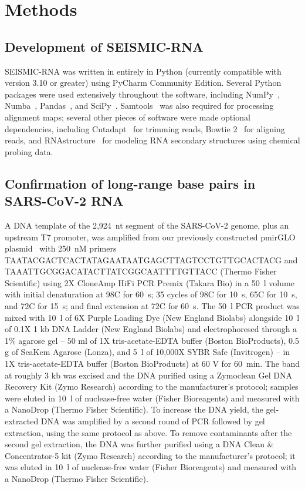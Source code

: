 \documentclass[main.tex]{subfiles}
\begin{document}
\section{Methods}
\label{methods}


\subsection{Development of SEISMIC-RNA}

SEISMIC-RNA was written in entirely in Python (currently compatible with version 3.10 or greater) using PyCharm Community Edition.
Several Python packages were used extensively throughout the software, including NumPy~\cite{Harris2020}, Numba~\cite{Lam2015}, Pandas~\cite{McKinney2010,Reback2020}, and SciPy~\cite{Virtanen2020}.
Samtools~\cite{Li2009} was also required for processing alignment maps; several other pieces of software were made optional dependencies, including Cutadapt~\cite{Martin2011} for trimming reads, Bowtie 2~\cite{Langmead2012} for aligning reads, and RNAstructure~\cite{Reuter2010} for modeling RNA secondary structures using chemical probing data.


\subsection{Confirmation of long-range base pairs in SARS-CoV-2 RNA}

A DNA template of the 2,924~nt segment of the SARS-CoV-2 genome, plus an upstream T7 promoter, was amplified from our previously constructed pmirGLO plasmid~\cite{Lan2022} with 250~nM primers TAATACGACTCACTATAGAATAATGAGCTTAGTCCTGTTGCACTACG and TAAATTGCGGACATACTTATCGGCAATTTTGTTACC (Thermo Fisher Scientific) using 2X CloneAmp HiFi PCR Premix (Takara Bio) in a 50~\textmu l volume with initial denaturation at 98\textdegree C for 60~s; 35 cycles of 98\textdegree C for 10~s, 65\textdegree C for 10~s, and 72\textdegree C for 15~s; and final extension at 72\textdegree C for 60~s.
The 50~\textmu l PCR product was mixed with 10~\textmu l of 6X Purple Loading Dye (New England Biolabs) alongside 10~\textmu l of 0.1X 1 kb DNA Ladder (New England Biolabs) and electrophoresed through a 1\% agarose gel -- 50 ml of 1X tris-acetate-EDTA buffer (Boston BioProducts), 0.5 g of SeaKem Agarose (Lonza), and 5~\textmu l of 10,000X SYBR Safe (Invitrogen) -- in 1X tris-acetate-EDTA buffer (Boston BioProducts) at 60 V for 60~min.
The band at roughly 3 kb was excised and the DNA purified using a Zymoclean Gel DNA Recovery Kit (Zymo Research) according to the manufacturer's protocol; samples were eluted in 10~\textmu l of nuclease-free water (Fisher Bioreagents) and measured with a NanoDrop (Thermo Fisher Scientific).
To increase the DNA yield, the gel-extracted DNA was amplified by a second round of PCR followed by gel extraction, using the same protocol as above.
To remove contaminants after the second gel extraction, the DNA was further purified using a DNA Clean \& Concentrator-5 kit (Zymo Research) according to the manufacturer's protocol; it was eluted in 10~\textmu l of nuclease-free water (Fisher Bioreagents) and measured with a NanoDrop (Thermo Fisher Scientific).
\end{document}
